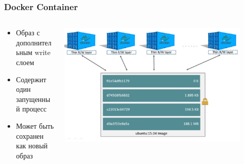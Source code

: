 \documentclass{../../slides-style}
\begin{document}
    \begin{frame}
        \frametitle{Docker Container}
        \begin{columns}
            \begin{column}{0.5\textwidth}
                \begin{itemize}
                    \item Образ с дополнительным write слоем
                    \item Содержит один запущенный процесс
                    \item Может быть сохранен как новый образ
                \end{itemize}
            \end{column}
            \begin{column}{0.5\textwidth}
                \includegraphics[width=0.9\textwidth]{dockerContainer.png}
            \end{column}
        \end{columns}
    \end{frame}
\end{document}
